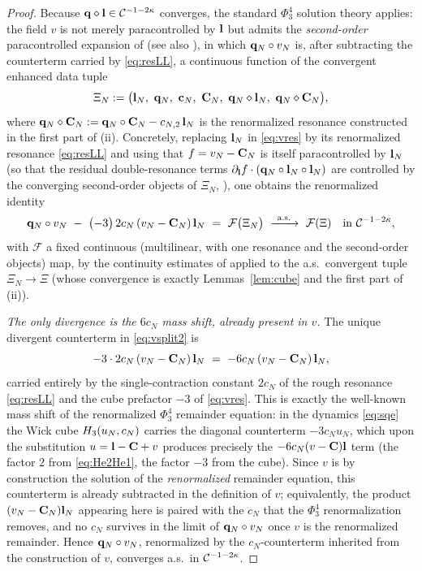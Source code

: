 \begin{proof}
Because $\mathbf{q}\diamond\mathbf{l}\in\mathcal{C}^{-1-2\kappa}$ converges, the standard
$\Phi^4_3$ solution theory applies: the field $v$ is not merely paracontrolled by
$\mathbf{l}$ but admits the \emph{second-order} paracontrolled expansion of \cite{CC18}
(see also \cite[\S3]{EW24}), in which $\mathbf{q}_N\circ v_N$ is, after subtracting the
counterterm carried by \eqref{eq:resLL}, a continuous function of the convergent
enhanced data tuple
\begin{equation}\label{eq:enh}
\Xi_N:=\bigl(\qoneLin_N,\ \qoneLsq_N,\ \qoneLcb_N,\ \qoneIqc_N,\ \qoneLsq_N\diamond\qoneLin_N,\ \qoneLsq_N\diamond\qoneIqc_N\bigr),
\end{equation}
where $\mathbf{q}_N\diamond\mathbf{C}_N:=\mathbf{q}_N\circ\mathbf{C}_N-c_{N,2}\,\mathbf{l}_N$ is the
renormalized resonance constructed in the first part of (ii). Concretely, replacing
$\mathbf{l}_N$ in \eqref{eq:vres} by its renormalized resonance \eqref{eq:resLL} and using
that $f=v_N-\mathbf{C}_N$ is itself paracontrolled by $\mathbf{l}_N$ (so that the residual
double-resonance terms $\partial_{\mathbf{l}}f\cdot(\mathbf{q}_N\circ\mathbf{l}_N\circ\mathbf{l}_N)$
are controlled by the converging second-order objects of $\Xi_N$, \cite{CC18}),
one obtains the renormalized identity
\begin{equation}\label{eq:vsplit2}
\qoneLsq_N\circ v_N\ -\ \bigl(-3\bigr)\,2c_N\,(v_N-\qoneIqc_N)\,\qoneLin_N
\ =\ \mathcal F\bigl(\Xi_N\bigr)\ \xrightarrow{\ \mathrm{a.s.}\ }\ \mathcal F(\Xi)\quad\text{in }\qoneC^{-1-2\kappa},
\end{equation}
with $\mathcal F$ a fixed continuous (multilinear, with one resonance and the
second-order objects) map, by the continuity estimates of \cite{CC18,GIP15} applied to
the a.s.\ convergent tuple $\Xi_N\to\Xi$ (whose convergence is exactly
Lemmas~\ref{lem:cube} and the first part of (ii)).

\emph{The only divergence is the $6c_N$ mass shift, already present in $v$.}
The unique divergent counterterm in \eqref{eq:vsplit2} is
\[
-3\cdot 2c_N\,(v_N-\qoneIqc_N)\,\qoneLin_N\ =\ -6c_N\,(v_N-\qoneIqc_N)\,\qoneLin_N ,
\]
carried entirely by the single-contraction constant $2c_N$ of the rough resonance
\eqref{eq:resLL} and the cube prefactor $-3$ of \eqref{eq:vres}. This is exactly the
well-known mass shift of the renormalized $\Phi^4_3$ remainder equation: in the dynamics
\eqref{eq:sqe} the Wick cube $H_3(u_N,c_N)$ carries the diagonal counterterm
$-3c_N u_N$, which upon the substitution $u=\mathbf{l}-\mathbf{C}+v$ produces precisely the
$-6c_N(v-\mathbf{C})\mathbf{l}$ term (the factor $2$ from \eqref{eq:He2He1}, the factor $-3$ from
the cube). Since $v$ is by construction the solution of the \emph{renormalized}
remainder equation, this counterterm is already subtracted in the definition of $v$;
equivalently, the product $(v_N-\mathbf{C}_N)\mathbf{l}_N$ appearing here is paired with the
$c_N$ that the $\Phi^4_3$ renormalization removes, and no $c_N$ survives in the limit
of $\mathbf{q}_N\circ v_N$ once $v$ is the renormalized remainder. Hence
$\mathbf{q}_N\circ v_N$, renormalized by the $c_N$-counterterm inherited from the
construction of $v$, converges a.s.\ in $\mathcal{C}^{-1-2\kappa}$.


\end{proof}
